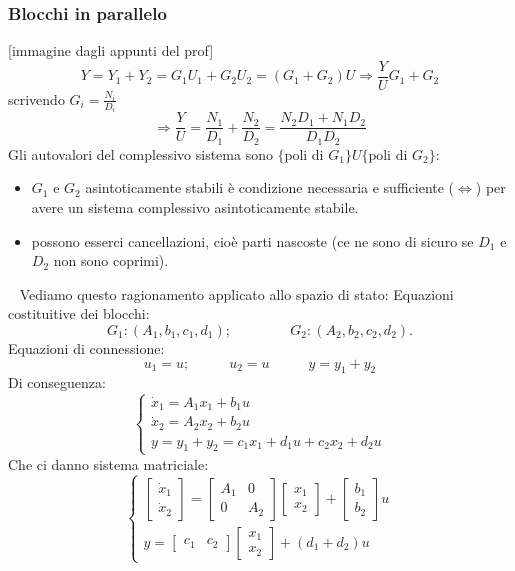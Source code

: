 \subsubsection{Blocchi in parallelo}
[immagine dagli appunti del prof]\newline
\[
    Y = Y_1 + Y_2 = G_1 U_1 + G_2 U_2 = (G_1 + G_2)U \Longrightarrow \frac{Y}{U} G_1 +G_2
\]
scrivendo $G_i= \frac{N_i}{D_i}$
\[
    \Longrightarrow \frac{Y}{U} = \frac{N_1}{D_1} + \frac{N_2}{D_2} = \frac{N_2 D_1 + N_1 D_2}{D_1D_2}
\]
Gli autovalori del complessivo sistema sono $\{\text{poli di $G_1$}\} U \{\text{poli di $G_2$}\}$:
\begin{itemize}
    \item $G_1$ e $G_2$ asintoticamente stabili è condizione necessaria e sufficiente ($\Leftrightarrow$) per avere un sistema complessivo asintoticamente stabile.
    \item possono esserci cancellazioni, cioè parti nascoste (ce ne sono di sicuro se $D_1$ e $D_2$ non sono coprimi).
\end{itemize}
\ \newline
Vediamo questo ragionamento applicato allo spazio di stato:\newline
Equazioni costituitive dei blocchi:
\[
    G_1 : (A_1, b_1, c_1,d_1); \;\;\;\;\;\;\;\;\;\;\;\;\;\;\; G_2 : (A_2, b_2,c_2,d_2).
\]
Equazioni di connessione:
\[
    u_1 = u; \;\;\;\;\;\;\;\;\;\; u_2 = u \;\;\;\;\;\;\;\;\;\; y=y_1 + y_2
\]
Di conseguenza:
\[
    \begin{cases}
        \dot{x}_1 = A_1 x_1 + b_1 u\\
        \dot{x}_2 = A_2 x_2 + b_2 u\\
        y = y_1 + y_2 = c_1 x_1 + d_1 u + c_2 x_2 + d_2 u
    \end{cases}
\]
Che ci danno sistema matriciale:
\[
    \begin{cases}
        \left[\begin{matrix}
            \dot{x}_1\\\dot{x}_2
        \end{matrix}\right] = \left[\begin{matrix}
            A_1 & 0 \\ 0 & A_2
        \end{matrix}\right] \left[\begin{matrix}
            x_1\\x_2
        \end{matrix}\right] + \left[\begin{matrix}
            b_1 \\b_2 
        \end{matrix}\right] u\\
        y = \left[\begin{matrix}
            c_1 & c_2
        \end{matrix}\right] \left[\begin{matrix}
            x_1\\x_2
        \end{matrix}\right] + (d_1 + d_2) u
    \end{cases}
\]
